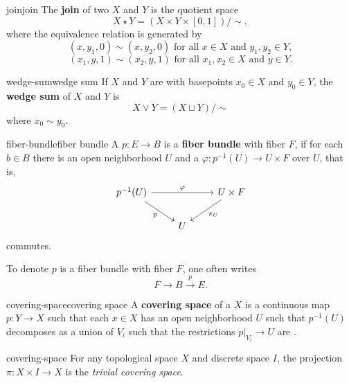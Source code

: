\begin{topic}{join}{join}
    The \textbf{join} of two  $X$ and $Y$ is the quotient space
    \[ X \star Y = (X \times Y \times [0, 1]) / \sim{} , \]
    where the equivalence relation is generated by
    \[ (x, y_1, 0) \sim{} (x, y_2, 0) \text{ for all } x \in X \text{ and } y_1, y_2 \in Y , \]
    \[ (x_1, y, 1) \sim{} (x_2, y, 1) \text{ for all } x_1, x_2 \in X \text{ and } y \in Y . \]
\end{topic}

\begin{topic}{wedge-sum}{wedge sum}
    If $X$ and $Y$ are  with basepoints $x_0 \in X$ and $y_0 \in Y$, the \textbf{wedge sum} of $X$ and $Y$ is 
    \[ X \vee Y = (X \sqcup Y) / \sim{} \]
    where $x_0 \sim{} y_0$.
\end{topic}

\begin{topic}{fiber-bundle}{fiber bundle}
    A  $p : E \to B$ is a \textbf{fiber bundle} with fiber $F$, if for each $b \in B$ there is an open neighborhood $U$ and a  $\varphi : p^{-1}(U) \to U \times F$ over $U$, that is,
    \[ \begin{tikzcd}
        p^{-1}(U) \arrow{rr}{\varphi} \arrow[swap]{dr}{p} && U \times F \arrow{ld}{\pi_U} \\ & U &
    \end{tikzcd} \]
    commutes.
    
    To denote $p$ is a fiber bundle with fiber $F$, one often writes
    \[ F \to B \xrightarrow{p} E . \]
\end{topic}

\begin{topic}{covering-space}{covering space}
    A \textbf{covering space} of a  $X$ is a continuous map $p : Y \to X$ such that each $x \in X$ has an open neighborhood $U$ such that $p^{-1}(U)$ decomposes as a union of $V_i$ such that the restrictions $p|_{V_i} \to U$ are .
\end{topic}

\begin{example}{covering-space}
    For any topological space $X$ and discrete space $I$, the projection $\pi : X \times I \to X$ is the \textit{trivial covering space}.
\end{example}

